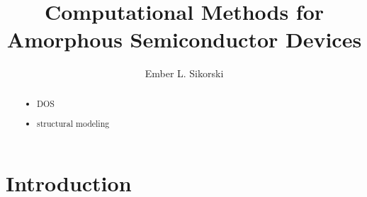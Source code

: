 \documentclass[3p,review,12pt]{elsarticle}
\begin{document}
\begin{frontmatter}
	\title{Computational Methods for Amorphous Semiconductor Devices}
	
	\author[boise]{Ember L. Sikorski}
	
	
	\address[boise]{Boise State University}
	
	\begin{abstract}
\begin{itemize}
	\item DOS
	\item structural modeling
\end{itemize}
	\end{abstract}
	
	
\end{frontmatter}

\section{Introduction}
\end{document}
